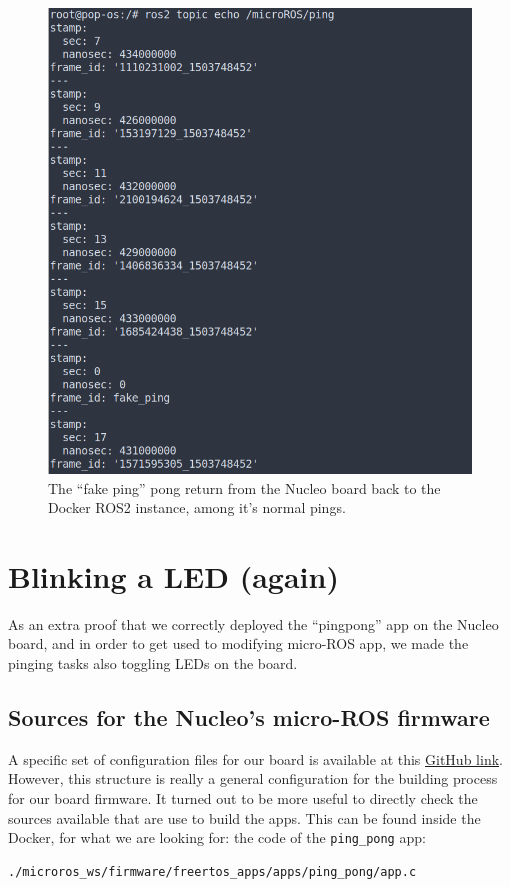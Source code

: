 \documentclass[10pt]{article}
\begin{document}
\begin{figure}[H]
  \centering
  \includegraphics[width=.9\textwidth]{./img/pingpong.png}
  \caption{The ``fake ping'' pong return from the Nucleo board back to the Docker ROS2 instance, among it's normal pings.}
  \label{fig:pingpong}
\end{figure}


\section{Blinking a LED (again)}
\label{sec:blinking-led-again}
As an extra proof that we correctly deployed the ``pingpong'' app on the Nucleo board, and in order to get used to modifying micro-ROS app, we made the pinging tasks also toggling LEDs on the board.

\subsection{Sources for the Nucleo's micro-ROS firmware}
\label{sec:sourc-nucl-micro}
A specific set of configuration files for our board is available at this \href{https://github.com/micro-ROS/micro_ros_setup/tree/humble/config/freertos/nucleo_f746zg}{GitHub link}.
However, this structure is really a general configuration for the building process for our board firmware. It turned out to be more useful to directly check the sources available that are use to build the apps.
This can be found inside the Docker, for what we are looking for: the code of the \verb|ping_pong| app:
\begin{tcolorbox}
\begin{verbatim}
./microros_ws/firmware/freertos_apps/apps/ping_pong/app.c
\end{verbatim}
\end{tcolorbox}
\end{document}
